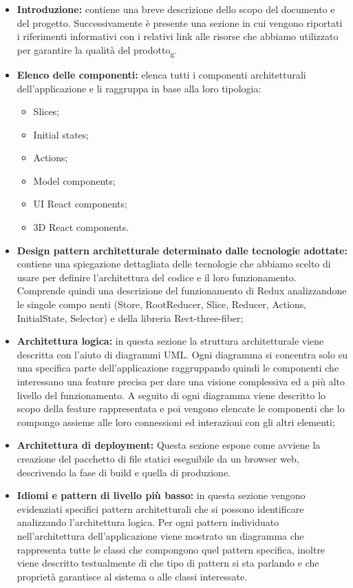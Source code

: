 \begin{itemize}
\item \textbf{Introduzione:} contiene una breve descrizione dello scopo del documento e del progetto.
Successivamente è presente una sezione in cui vengono riportati i riferimenti informativi 
con i relativi link alle risorse che abbiamo utilizzato per garantire la qualità del prodotto\textsubscript{g}.

\item \textbf{Elenco delle componenti:} elenca tutti i componenti architetturali dell'applicazione e li raggruppa in base alla loro tipologia:
\begin{itemize}
 	\item Slices;
 	\item  Initial states;
 	\item Actions; 
 	\item Model components; 
 	\item UI React components; 
 	\item 3D React components.
\end{itemize}

\item \textbf{Design pattern architetturale determinato dalle tecnologie adottate:} contiene una spiegazione dettagliata delle tecnologie che abbiamo scelto di usare per definire l'architettura del codice e il loro funzionamento.
Comprende quindi una descrizione del funzionamento di Redux analizzandone le singole compo	nenti (Store, RootReducer, Slice, Reducer, Actions, InitialState, Selector) e della libreria Rect-three-fiber;

\item \textbf{ Architettura logica:} in questa sezione la struttura architetturale viene descritta con l'aiuto di diagrammi UML. Ogni diagramma si concentra solo su una specifica parte dell'applicazione raggruppando quindi le componenti che interessano una feature precisa per dare una visione complessiva ed a più alto livello del funzionamento.
A seguito di ogni diagramma viene descritto lo scopo della feature rappresentata e poi vengono elencate le componenti che lo compongo assieme alle loro connessioni ed interazioni con gli altri elementi;

\item \textbf{Architettura di deployment:} Questa sezione espone come avviene la creazione del pacchetto di file statici eseguibile da un browser web, descrivendo la fase di build e quella di produzione.

\item \textbf{Idiomi e pattern di livello più basso:} in questa sezione vengono evidenziati specifici pattern architetturali che si possono identificare analizzando l'architettura logica. Per ogni pattern individuato nell'architettura dell'applicazione viene mostrato un diagramma che rappresenta tutte le classi che compongono quel pattern specifica, inoltre viene descritto testualmente di che tipo di pattern si sta parlando e che proprietà garantisce al sistema o alle classi interessate.

\end{itemize}